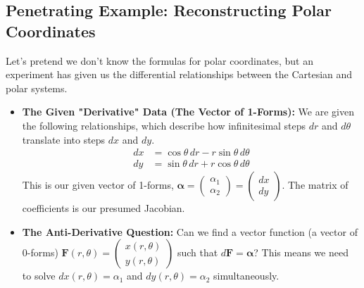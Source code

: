 \documentclass[12pt, letterpaper]{article}
\theoremstyle{definition}
\begin{document}
	\subsection{Penetrating Example: Reconstructing Polar Coordinates}
	Let's pretend we don't know the formulas for polar coordinates, but an experiment has given us the differential relationships between the Cartesian and polar systems.
	
	\begin{itemize}
		\item \textbf{The Given "Derivative" Data (The Vector of 1-Forms):} We are given the following relationships, which describe how infinitesimal steps $dr$ and $d\theta$ translate into steps $dx$ and $dy$.
		\begin{align*}
			dx &= \cos\theta \, dr - r\sin\theta \, d\theta \\
			dy &= \sin\theta \, dr + r\cos\theta \, d\theta
		\end{align*}
		This is our given vector of 1-forms, $\mathbf{\alpha} = \begin{pmatrix} \alpha_1 \\ \alpha_2 \end{pmatrix} = \begin{pmatrix} dx \\ dy \end{pmatrix}$. The matrix of coefficients is our presumed Jacobian.
		
		\item \textbf{The Anti-Derivative Question:} Can we find a vector function (a vector of 0-forms) $\mathbf{F}(r, \theta) = \begin{pmatrix} x(r, \theta) \\ y(r, \theta) \end{pmatrix}$ such that $d\mathbf{F} = \mathbf{\alpha}$? This means we need to solve $dx(r,\theta) = \alpha_1$ and $dy(r,\theta) = \alpha_2$ simultaneously.
		

\end{itemize}
\end{document}
